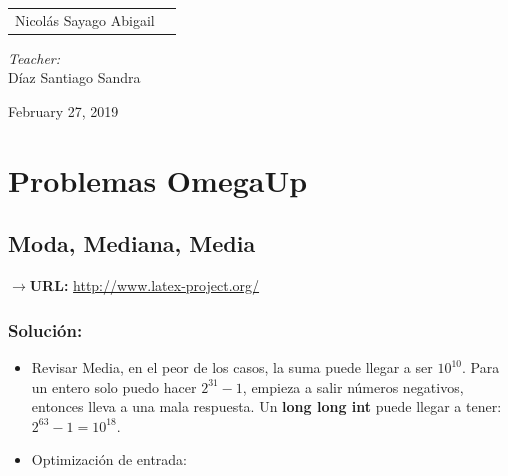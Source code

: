 \documentclass[12pt]{article}
\begin{document}
\begin{titlepage}
\begin{center}
\begin{minipage}{0.5\textwidth}
\begin{flushleft}
					\begin{tabular}{ll}
				     Nicolás Sayago Abigail\\

				\end{tabular}
				\end{flushleft}
			\end{minipage}%
			\begin{minipage}{0.5\textwidth}
				\begin{flushright} \large
					\emph{Teacher:} \\
					Díaz Santiago Sandra  \\
				\end{flushright}
			\end{minipage}
			
			\vfill
			
			{\large February 27, 2019}
		\end{center}
	\end{titlepage}
	
    \tableofcontents
    \newpage
    
    \section{Problemas OmegaUp}
         
          \subsection{Moda, Mediana, Media}
            $\rightarrow$\textbf{URL: }\url{http://www.latex-project.org/}
            
            \subsubsection{Solución:}
                \begin{itemize}
                    \item Revisar Media, en el peor de los casos, la suma puede llegar a ser $10^{10}$. Para un entero solo puedo hacer $2^{31}-1$, empieza a salir números negativos, entonces lleva a una mala respuesta. Un \textbf{long long int} puede llegar a tener: $2^{63}-1 = 10^{18}$.
                    
                    \item Optimización de entrada:
                        \inputminted{cpp}{Code/OmegaUp/optimizacionIn.cpp}
                \end{itemize}
            
\end{document}
